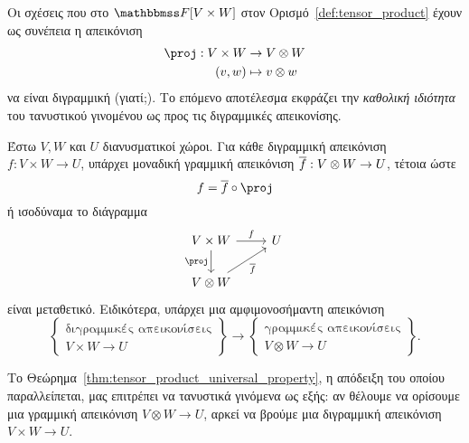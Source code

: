 \documentclass[12pt,a4paper,reqno]{amsart}
\begin{document}
Οι σχέσεις που  στο $\FF[V\times{W}]$ στον Ορισμό~\ref{def:tensor_product} έχουν ως συνέπεια η απεικόνιση
\begin{align*}
\proj : V \times W &\to V \otimes W \\
(v,w) &\mapsto v \otimes w
\end{align*}
να είναι διγραμμική (γιατί;). Το επόμενο αποτέλεσμα εκφράζει την \emph{καθολική ιδιότητα} του τανυστικού γινομένου ως προς τις διγραμμικές απεικονίσης.
\begin{theorem}
    \label{thm:tensor_product_universal_property}
    Έστω $V, W$ και $U$ διανυσματικοί χώροι. Για κάθε διγραμμική απεικόνιση $f: V \times W \to U$, υπάρχει μοναδική γραμμική απεικόνιση $\overline{f}: V \otimes W \rightarrow U$, τέτοια ώστε
    \[
    f = \ol{f} \circ \proj
    \]
    ή ισοδύναμα το διάγραμμα
    \[
    \begin{tikzcd}
    V\times W \arrow[r, "f"] \arrow[d, "\proj"'] & U \\
    V \otimes W   \arrow[ur, "\ol{f}"']          & 
    \end{tikzcd}
    \]
    είναι μεταθετικό. Ειδικότερα, υπάρχει μια αμφιμονοσήμαντη απεικόνιση 
    \[
    \left\{
        \begin{array}{c}
        \text{διγραμμικές απεικονίσεις} \\
        V \times W \to U
    \end{array}
    \right\} 
    \to
    \left\{
    \begin{array}{c}
        \text{γραμμικές απεικονίσεις} \\
        V \otimes W \to U
    \end{array}
    \right\}.    
    \]
\end{theorem}

Το Θεώρημα~\ref{thm:tensor_product_universal_property}, η απόδειξη του οποίου παραλλείπεται, μας επιτρέπει να  τανυστικά γινόμενα ως εξής: αν θέλουμε να ορίσουμε μια γραμμική απεικόνιση $V\otimes{W} \to U$, αρκεί να βρούμε μια διγραμμική απεικόνιση $V\times{W} \to U$.
\end{document}
